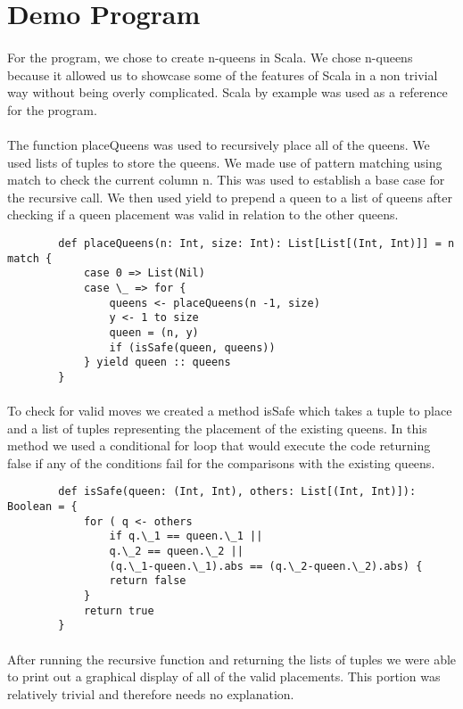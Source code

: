\documentclass[12pt]{article}
\begin{document}
\section{Demo Program}
	\paragraph{}For the program, we chose to create n-queens in Scala. We chose n-queens because it allowed us to showcase some of the features of Scala in a non trivial way without being overly complicated. Scala by example was used as a reference for the program.
	\paragraph{}The function placeQueens was used to recursively place all of the queens. We used lists of tuples to store the queens. We made use of pattern matching using match to check the current column n. This was used to establish a base case for the recursive call. We then used yield to prepend a queen to a list of queens after checking if a queen placement was valid in relation to the other queens.
	\begin{lstlisting}
		def placeQueens(n: Int, size: Int): List[List[(Int, Int)]] = n match {
			case 0 => List(Nil)
			case \_ => for {
				queens <- placeQueens(n -1, size)
				y <- 1 to size
				queen = (n, y)
				if (isSafe(queen, queens))
			} yield queen :: queens
		}

	\end{lstlisting}
	\paragraph{}To check for valid moves we created a method isSafe which takes a tuple to place and a list of tuples representing the placement of the existing queens. In this method we used a conditional for loop that would execute the code returning false if any of the conditions fail for the comparisons with the existing queens.
	\begin{lstlisting}
		def isSafe(queen: (Int, Int), others: List[(Int, Int)]): Boolean = {
			for ( q <- others
				if q.\_1 == queen.\_1 ||
				q.\_2 == queen.\_2 ||
				(q.\_1-queen.\_1).abs == (q.\_2-queen.\_2).abs) {
				return false
			}
			return true
		}

	\end{lstlisting}
	\paragraph{}After running the recursive function and returning the lists of tuples we were able to print out a graphical display of all of the valid placements. This portion was relatively trivial and therefore needs no explanation.
\end{document}
